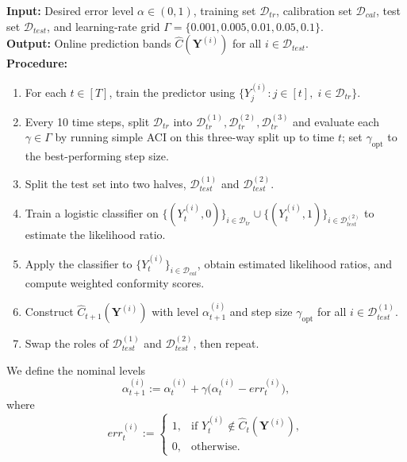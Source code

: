 \documentclass{article}
\numberwithin{equation}{section}
\begin{document}
\begin{table}[t]
\centering
\caption{Online weighted CAFHT procedure.}
\label{alg:main}
\begin{minipage}{0.94\linewidth}
\small
\textbf{Input:} Desired error level $\alpha \in (0,1)$, training set $\mathcal{D}_{tr}$, calibration set $\mathcal{D}_{cal}$, test set $\mathcal{D}_{test}$, and learning-rate grid $\Gamma = \{0.001, 0.005, 0.01, 0.05, 0.1\}$.\\[0.5ex]
\textbf{Output:} Online prediction bands $\hat{C}(\mathbf{Y}^{(i)})$ for all $i \in \mathcal{D}_{test}$.\\[0.75ex]
\textbf{Procedure:}
\begin{enumerate}
    \item For each $t \in [T]$, train the predictor using $\{Y_j^{(i)} : j \in [t],\; i \in \mathcal{D}_{tr}\}$.
    \item Every 10 time steps, split $\mathcal{D}_{tr}$ into $\mathcal{D}_{tr}^{(1)}, \mathcal{D}_{tr}^{(2)}, \mathcal{D}_{tr}^{(3)}$ and evaluate each $\gamma \in \Gamma$ by running simple ACI on this three-way split up to time $t$; set $\gamma_{\mathrm{opt}}$ to the best-performing step size.
    \item Split the test set into two halves, $\mathcal{D}_{test}^{(1)}$ and $\mathcal{D}_{test}^{(2)}$.
    \item Train a logistic classifier on $\{(Y_t^{(i)},0)\}_{i \in \mathcal{D}_{tr}} \cup \{(Y_t^{(i)},1)\}_{i \in \mathcal{D}_{test}^{(2)}}$ to estimate the likelihood ratio.
    \item Apply the classifier to $\{Y_t^{(i)}\}_{i \in \mathcal{D}_{cal}}$, obtain estimated likelihood ratios, and compute weighted conformity scores.
    \item Construct $\hat{C}_{t+1}(\mathbf{Y}^{(i)})$ with level $\alpha_{t+1}^{(i)}$ and step size $\gamma_{\mathrm{opt}}$ for all $i \in \mathcal{D}_{test}^{(1)}$.
    \item Swap the roles of $\mathcal{D}_{test}^{(1)}$ and $\mathcal{D}_{test}^{(2)}$, then repeat.
\end{enumerate}
\end{minipage}
\end{table}

We define the nominal levels
\[
\alpha_{t+1}^{(i)} := \alpha_t^{(i)} + \gamma \bigl( \alpha_t^{(i)} - err_t^{(i)} \bigr),
\]
where
\[
err_t^{(i)} :=
\begin{cases}
1, & \text{if } Y_t^{(i)} \notin \hat{C}_t(\mathbf{Y}^{(i)}), \\
0, & \text{otherwise}.
\end{cases}
\]
\end{document}
